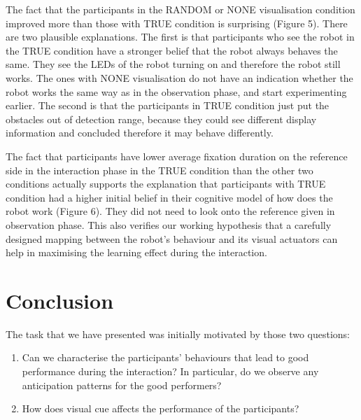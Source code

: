 \documentclass{sig-alternate}
\begin{document}
The fact that the participants in the {\sf RANDOM} or {\sf NONE} visualisation
condition improved more than those with {\sf TRUE} condition is surprising
(Figure 5). There are two plausible explanations. The first is that
participants who see the robot in the {\sf TRUE} condition have a stronger
belief that the robot always behaves the same. They see the LEDs of the
robot turning on and therefore the robot still works. The ones with {\sf NONE}
visualisation do not have an indication whether the robot works the same
way as in the observation phase, and start experimenting earlier. The
second is that the participants in {\sf TRUE} condition just put the obstacles
out of detection range, because they could see different display
information and concluded therefore it may behave differently.

The fact that participants have lower average fixation duration on the
reference side in the interaction phase in the {\sf TRUE} condition than the
other two conditions actually supports the explanation that participants
with {\sf TRUE} condition had a higher initial belief in their cognitive model
of how does the robot work (Figure 6). They did not need to look onto
the reference given in observation phase. This also verifies our working
hypothesis that a carefully designed mapping between the robot's
behaviour and its visual actuators can help in maximising the learning
effect during the interaction.


\section{Conclusion}

The task that we have presented was initially motivated by those two questions:

\begin{enumerate}
    \item Can we characterise the participants' behaviours that
        lead to good performance during the interaction? In particular, do
        we observe any anticipation patterns for the good performers?

    \item How does visual cue affects the performance of the participants?

\end{enumerate}
\end{document}
